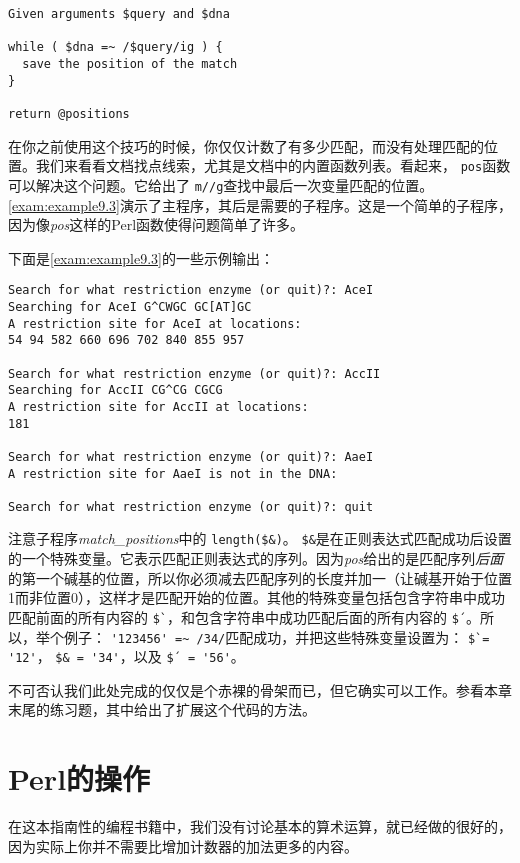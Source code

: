\begin{lstlisting}
Given arguments $query and $dna

while ( $dna =~ /$query/ig ) {
  save the position of the match
}

return @positions
\end{lstlisting}

在你之前使用这个技巧的时候，你仅仅计数了有多少匹配，而没有处理匹配的位置。我们来看看文档找点线索，尤其是文档中的内置函数列表。看起来， \verb|pos|函数可以解决这个问题。它给出了 \verb|m//g|查找中最后一次变量匹配的位置。\autoref{exam:example9.3}演示了主程序，其后是需要的子程序。这是一个简单的子程序，因为像\textit{pos}这样的Perl函数使得问题简单了许多。



下面是\autoref{exam:example9.3}的一些示例输出：

\begin{lstlisting}
Search for what restriction enzyme (or quit)?: AceI
Searching for AceI G^CWGC GC[AT]GC
A restriction site for AceI at locations:
54 94 582 660 696 702 840 855 957

Search for what restriction enzyme (or quit)?: AccII
Searching for AccII CG^CG CGCG
A restriction site for AccII at locations:
181

Search for what restriction enzyme (or quit)?: AaeI
A restriction site for AaeI is not in the DNA:

Search for what restriction enzyme (or quit)?: quit
\end{lstlisting}

注意子程序\textit{match\_positions}中的 \verb|length($&)|。 \verb|$&|是在正则表达式匹配成功后设置的一个特殊变量。它表示匹配正则表达式的序列。因为\textit{pos}给出的是匹配序列\textit{后面}的第一个碱基的位置，所以你必须减去匹配序列的长度并加一（让碱基开始于位置1而非位置0），这样才是匹配开始的位置。其他的特殊变量包括包含字符串中成功匹配前面的所有内容的 \verb|$`|，和包含字符串中成功匹配后面的所有内容的 \verb|$´|。所以，举个例子： \verb|'123456' =~ /34/|匹配成功，并把这些特殊变量设置为： \verb|$`= '12'|， \verb|$& = '34'|，以及 \verb|$´ = '56'|。

不可否认我们此处完成的仅仅是个赤裸的骨架而已，但它确实可以工作。参看本章末尾的练习题，其中给出了扩展这个代码的方法。

\section{Perl的操作}
在这本指南性的编程书籍中，我们没有讨论基本的算术运算，就已经做的很好的，因为实际上你并不需要比增加计数器的加法更多的内容。

